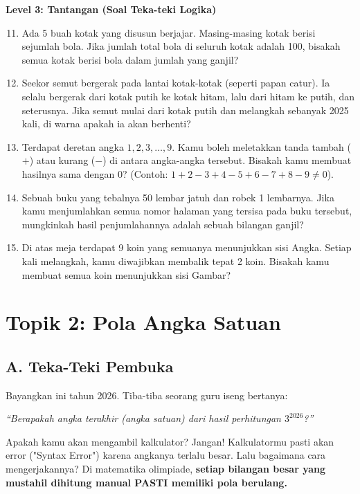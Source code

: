 \documentclass[11pt,a4paper]{article}
\begin{document}
\textbf{Level 3: Tantangan (Soal Teka-teki Logika)}
\begin{enumerate}
    \setcounter{enumi}{10}
    \item Ada 5 buah kotak yang disusun berjajar. Masing-masing kotak berisi sejumlah bola. Jika jumlah total bola di seluruh kotak adalah 100, bisakah semua kotak berisi bola dalam jumlah yang ganjil?
    \item Seekor semut bergerak pada lantai kotak-kotak (seperti papan catur). Ia selalu bergerak dari kotak putih ke kotak hitam, lalu dari hitam ke putih, dan seterusnya. Jika semut mulai dari kotak putih dan melangkah sebanyak 2025 kali, di warna apakah ia akan berhenti?
    \item Terdapat deretan angka $1, 2, 3, \dots, 9$. Kamu boleh meletakkan tanda tambah ($+$) atau kurang ($-$) di antara angka-angka tersebut. Bisakah kamu membuat hasilnya sama dengan 0? (Contoh: $1+2-3+4-5+6-7+8-9 \neq 0$).
    \item Sebuah buku yang tebalnya 50 lembar jatuh dan robek 1 lembarnya. Jika kamu menjumlahkan semua nomor halaman yang tersisa pada buku tersebut, mungkinkah hasil penjumlahannya adalah sebuah bilangan ganjil?
    \item Di atas meja terdapat 9 koin yang semuanya menunjukkan sisi Angka. Setiap kali melangkah, kamu diwajibkan membalik tepat 2 koin. Bisakah kamu membuat semua koin menunjukkan sisi Gambar?
\end{enumerate}

\newpage

\section*{Topik 2: Pola Angka Satuan}

\subsection*{A. Teka-Teki Pembuka}
Bayangkan ini tahun 2026. Tiba-tiba seorang guru iseng bertanya: 
\begin{center}
\textit{``Berapakah angka terakhir (angka satuan) dari hasil perhitungan $3^{2026}$?''}
\end{center}

Apakah kamu akan mengambil kalkulator? Jangan! Kalkulatormu pasti akan error ("Syntax Error") karena angkanya terlalu besar. Lalu bagaimana cara mengerjakannya? Di matematika olimpiade, \textbf{setiap bilangan besar yang mustahil dihitung manual PASTI memiliki pola berulang.}
\end{document}
